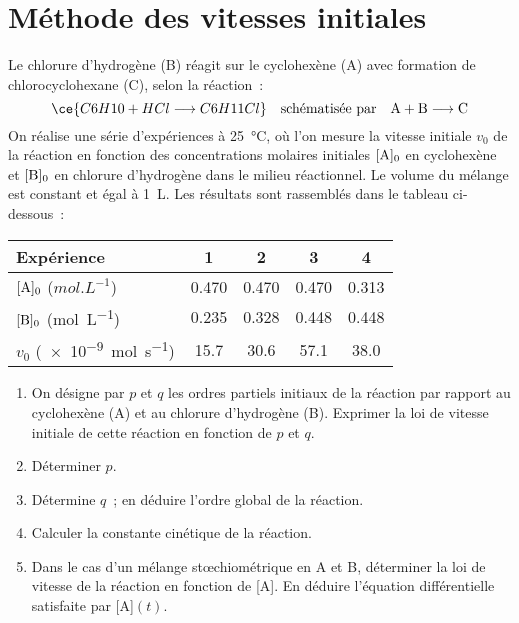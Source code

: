 \documentclass[a4paper, 12pt, final, garamond]{book}
\begin{document}
\section{Méthode des vitesses initiales}
Le chlorure d'hydrogène (B) réagit sur le cyclohexène (A) avec formation de
chlorocyclohexane (C), selon la réaction~:
\[\ce{C6H10 + HCl \longrightarrow C6H11Cl}
    \quad
    \text{schématisée par}
    \quad
    {\rm A} + {\rm B} \longrightarrow {\rm C}
\]
On réalise une série d'expériences à \SI{25}{\degreeCelsius}, où l'on mesure la
vitesse initiale $v_0$ de la réaction en fonction des concentrations molaires
initiales $[{\rm A}]_0$ en cyclohexène et $[{\rm B}]_0$ en chlorure d'hydrogène
dans le milieu réactionnel. Le volume du mélange est constant et égal à
\SI{1}{L}. Les résultats sont rassemblés dans le tableau ci-dessous~:
\begin{center}
    \begin{tabular}{lcccc}
        \toprule 
        Expérience &
        1 & 2 & 3 & 4\\
        \midrule
        $[{\rm A}]_0$ ($\si{mol.L^{-1}}$) &
        \num{0.470} & \num{0.470} & \num{0.470} & \num{0.313}\\
        $[{\rm B}]_0$ (\si{mol.L^{-1}}) &
        \num{0.235} & \num{0.328} & \num{0.448} & \num{0.448}\\
        $v_0$ (\SI{e-9}{mol.s^{-1}}) &
        \num{15.7} & \num{30.6} & \num{57.1} & \num{38.0}\\
        \bottomrule
    \end{tabular}
\end{center}
\begin{enumerate}
    \item On désigne par $p$ et $q$ les ordres partiels initiaux de la réaction
        par rapport au cyclohexène (A) et au chlorure d'hydrogène (B). Exprimer
        la loi de vitesse initiale de cette réaction en fonction de $p$ et $q$.
    \item Déterminer $p$.
    \item Détermine $q$~; en déduire l'ordre global de la réaction.
    \item Calculer la constante cinétique de la réaction.
    \item Dans le cas d'un mélange stœchiométrique en A et B, déterminer la loi
        de vitesse de la réaction en fonction de [A]. En déduire l'équation
        différentielle satisfaite par [A]$(t)$.
\end{enumerate}
\end{document}
